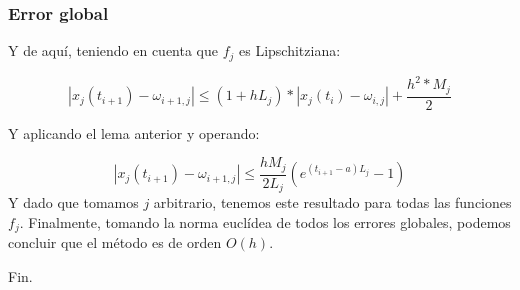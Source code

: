 \documentclass{beamer}
\begin{document}
\begin{frame}
	\frametitle{Error global}
	Y de aquí, teniendo en cuenta que $f_j$ es Lipschitziana:
	
	$$ | x_j(t_{i+1}) - \omega_{i+1,j} | \leq (1+hL_j)*| x_j(t_i) - \omega_{i,j} | + \frac{h^2*M_j}{2} $$
	
	Y aplicando el lema anterior y operando:
	
	$$ | x_j(t_{i+1}) - \omega_{i+1, j} | \leq \frac{hM_j}{2L_j}(e^{(t_{i+1}-a)L_j} - 1) $$
	Y dado que tomamos $j$ arbitrario, tenemos este resultado para todas las funciones $f_j$. Finalmente, tomando la norma euclídea de todos los errores globales, podemos concluir que el método es de orden $O(h)$.
\end{frame}

\begin{frame}
\Huge{\centerline{Fin.}}
\end{frame}

\end{document}
